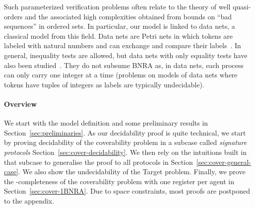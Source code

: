 Such parameterized verification problems often relate to the theory of well quasi-orders
and the associated high complexities obtained from bounds on ``bad sequences'' in ordered sets. In particular, our model is linked to data nets, a classical model from this field. Data nets are Petri nets in which tokens are labeled with natural numbers and can exchange and compare their labels~\cite{LazicNORW08}. In general, inequality tests are allowed, but data nets with only equality tests have also been studied~\cite{Rosa-Velardo17}. They do not subsume BNRA as, in data nets, each process can only carry one integer at a time (problems on models of data nets where tokens have tuples of integers as labels are typically undecidable).

\paragraph*{Overview}
We start with the model definition and some preliminary results in Section~\ref{sec:preliminaries}. As our decidability proof is quite technical, we start by proving decidability of the coverability problem in a subcase called \emph{signature protocols} Section~\ref{sec:cover-decidability}.
We then rely on the intuitions built in that subcase to generalise the proof to all protocols in Section~\ref{sec:cover-general-case}. We also show the undecidability of the Target problem.
Finally, we prove the \NP-completeness of the coverability problem with one register per agent in Section~\ref{sec:cover-1BNRA}.
Due to space constraints, most proofs are postponed to the appendix.

